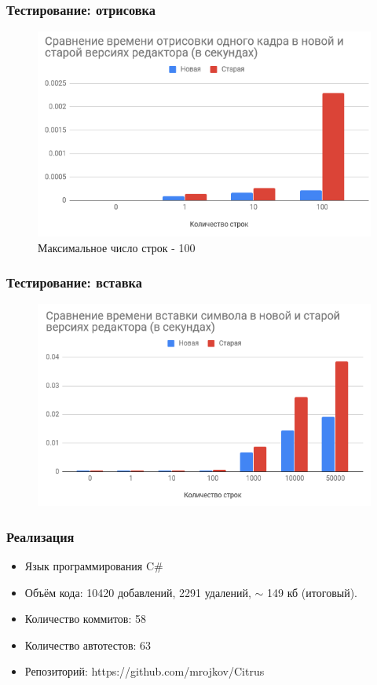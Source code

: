 \documentclass[10pt, unicode]{beamer}
\begin{document}
    \begin{frame}
        \frametitle{Тестирование: отрисовка}
        \begin{figure}
            \centering
            \includegraphics[width=\textwidth]{images/RenderComparisonSmall.png}
            \caption{Максимальное число строк - 100}
        \end{figure}
    \end{frame}
    \begin{frame}
        \frametitle{Тестирование: вставка}
        \begin{figure}
            \centering
            \includegraphics[width=\textwidth]{images/InsertionComparison.png}
        \end{figure}
    \end{frame}
    \begin{frame}
        \frametitle{Реализация}
        \begin{itemize}
            \item Язык программирования C\#
            \item Объём кода: 10420 добавлений, 2291 удалений, $\sim$ 149 кб (итоговый).
            \item Количество коммитов: 58
            \item Количество автотестов: 63
            \item Репозиторий: https://github.com/mrojkov/Citrus
        \end{itemize}
    \end{frame}
\end{document}

